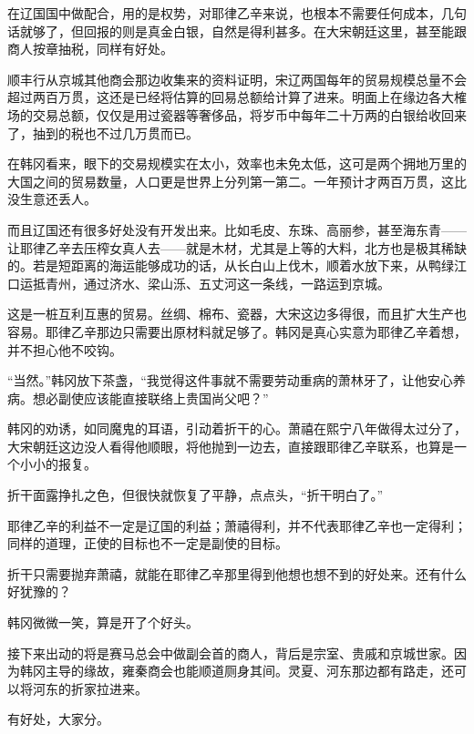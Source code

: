 在辽国国中做配合，用的是权势，对耶律乙辛来说，也根本不需要任何成本，几句话就够了，但回报的则是真金白银，自然是得利甚多。在大宋朝廷这里，甚至能跟商人按章抽税，同样有好处。

顺丰行从京城其他商会那边收集来的资料证明，宋辽两国每年的贸易规模总量不会超过两百万贯，这还是已经将估算的回易总额给计算了进来。明面上在缘边各大榷场的交易总额，仅仅是用过瓷器等奢侈品，将岁币中每年二十万两的白银给收回来了，抽到的税也不过几万贯而已。

在韩冈看来，眼下的交易规模实在太小，效率也未免太低，这可是两个拥地万里的大国之间的贸易数量，人口更是世界上分列第一第二。一年预计才两百万贯，这比没生意还丢人。

而且辽国还有很多好处没有开发出来。比如毛皮、东珠、高丽参，甚至海东青——让耶律乙辛去压榨女真人去——就是木材，尤其是上等的大料，北方也是极其稀缺的。若是短距离的海运能够成功的话，从长白山上伐木，顺着水放下来，从鸭绿江口运抵青州，通过济水、梁山泺、五丈河这一条线，一路运到京城。

这是一桩互利互惠的贸易。丝绸、棉布、瓷器，大宋这边多得很，而且扩大生产也容易。耶律乙辛那边只需要出原材料就足够了。韩冈是真心实意为耶律乙辛着想，并不担心他不咬钩。

“当然。”韩冈放下茶盏，“我觉得这件事就不需要劳动重病的萧林牙了，让他安心养病。想必副使应该能直接联络上贵国尚父吧？”

韩冈的劝诱，如同魔鬼的耳语，引动着折干的心。萧禧在熙宁八年做得太过分了，大宋朝廷这边没人看得他顺眼，将他抛到一边去，直接跟耶律乙辛联系，也算是一个小小的报复。

折干面露挣扎之色，但很快就恢复了平静，点点头，“折干明白了。”

耶律乙辛的利益不一定是辽国的利益；萧禧得利，并不代表耶律乙辛也一定得利；同样的道理，正使的目标也不一定是副使的目标。

折干只需要抛弃萧禧，就能在耶律乙辛那里得到他想也想不到的好处来。还有什么好犹豫的？

韩冈微微一笑，算是开了个好头。

接下来出动的将是赛马总会中做副会首的商人，背后是宗室、贵戚和京城世家。因为韩冈主导的缘故，雍秦商会也能顺道厕身其间。灵夏、河东那边都有路走，还可以将河东的折家拉进来。

有好处，大家分。
